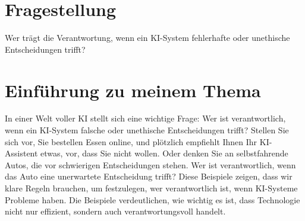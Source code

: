 \documentclass{article}
\begin{document}
\section {Fragestellung}
    Wer trägt die Verantwortung, wenn ein KI-System fehlerhafte oder unethische Entscheidungen trifft?

\section {Einführung zu meinem Thema}
In einer Welt voller KI stellt sich eine wichtige Frage: Wer ist verantwortlich, 
wenn ein KI-System falsche oder unethische Entscheidungen trifft? 
Stellen Sie sich vor, Sie bestellen Essen online, und plötzlich empfiehlt Ihnen Ihr KI-Assistent etwas, 
vor, dass Sie nicht wollen. Oder denken Sie an selbstfahrende Autos, 
die vor schwierigen Entscheidungen stehen. Wer ist verantwortlich, wenn das Auto eine unerwartete
 Entscheidung trifft? Diese Beispiele zeigen, dass wir klare Regeln brauchen, um festzulegen, wer verantwortlich ist, wenn KI-Systeme Probleme haben. 
 Die Beispiele verdeutlichen, wie wichtig es ist, dass Technologie nicht nur effizient, sondern auch verantwortungsvoll handelt.

\printbibliography
\end{document}
